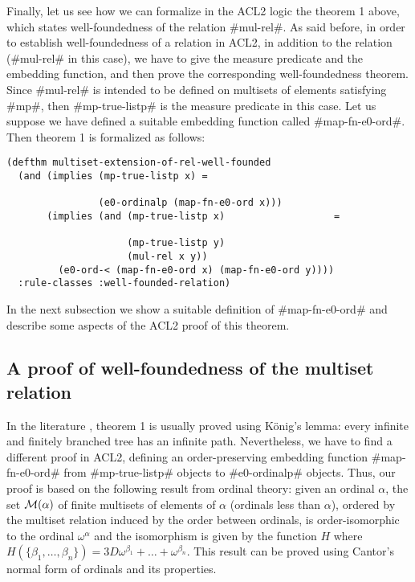 \documentclass[11pt]{llncs}
\begin{document}
{Finally, let us see how we can formalize in the ACL2 logic the theorem 1
above, which states well-foundedness of the relation #mul-rel#.  As said
before, in order to establish well-foundedness of a relation in ACL2, in
addition to the relation (#mul-rel# in this case), we have to give the
measure predicate and the embedding function, and then prove the
corresponding well-foundedness theorem. Since #mul-rel# is intended to
be defined on multisets of elements satisfying #mp#, then
#mp-true-listp# is the measure predicate in this case. Let us suppose we
have defined a suitable embedding function called #map-fn-e0-ord#. Then
theorem 1 is formalized as follows:

\begin{verbatim}
(defthm multiset-extension-of-rel-well-founded
  (and (implies (mp-true-listp x) =

                (e0-ordinalp (map-fn-e0-ord x)))
       (implies (and (mp-true-listp x)                   =

                     (mp-true-listp y)
                     (mul-rel x y))
         (e0-ord-< (map-fn-e0-ord x) (map-fn-e0-ord y))))
  :rule-classes :well-founded-relation)
\end{verbatim}

In the next subsection we show a suitable definition of #map-fn-e0-ord#
and describe some aspects of the ACL2 proof of this theorem.
\label{statement}

\subsection{A proof of well-foundedness of the multiset relation}
\label{proof-multiset}

In the literature \cite{Nipkow}, theorem 1 is usually proved using
K\"onig's lemma: every infinite and finitely branched tree has an
infinite path. Nevertheless, we have to find a different proof in ACL2,
defining an order-preserving embedding function #map-fn-e0-ord# from
#mp-true-listp# objects to #e0-ordinalp# objects. Thus, our proof is
based on the following result from ordinal theory: given an ordinal
$\alpha$, the set ${\cal M}(\alpha)$ of finite multisets of elements of
$\alpha$ (ordinals less than $\alpha$), ordered by the multiset relation
induced by the order between ordinals, is order-isomorphic to the
ordinal $\omega^{\alpha}$ and the isomorphism is given by the function
$H$ where $H(\{\beta_1,\ldots,\beta_n\})=3D
\omega^{\beta_1}+\ldots+\omega^{\beta_n}$. This result can be proved
using Cantor's normal form of ordinals and its properties.

}
\end{document}
